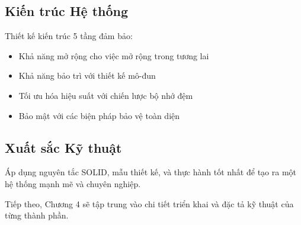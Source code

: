 \subsection{Kiến trúc Hệ thống}
Thiết kế kiến trúc 5 tầng đảm bảo:
\begin{itemize}
    \item Khả năng mở rộng cho việc mở rộng trong tương lai
    \item Khả năng bảo trì với thiết kế mô-đun
    \item Tối ưu hóa hiệu suất với chiến lược bộ nhớ đệm
    \item Bảo mật với các biện pháp bảo vệ toàn diện
\end{itemize}

\subsection{Xuất sắc Kỹ thuật}
Áp dụng nguyên tắc SOLID, mẫu thiết kế, và thực hành tốt nhất để tạo ra một hệ thống mạnh mẽ và chuyên nghiệp.

Tiếp theo, Chương 4 sẽ tập trung vào chi tiết triển khai và đặc tả kỹ thuật của từng thành phần.

